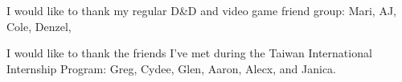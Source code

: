 I would like to thank my regular D\&D and video game friend group: Mari, AJ, Cole, Denzel, 

I would like to thank the friends I've met during the Taiwan International Internship Program: Greg, Cydee, Glen, Aaron, Alecx, and Janica. 